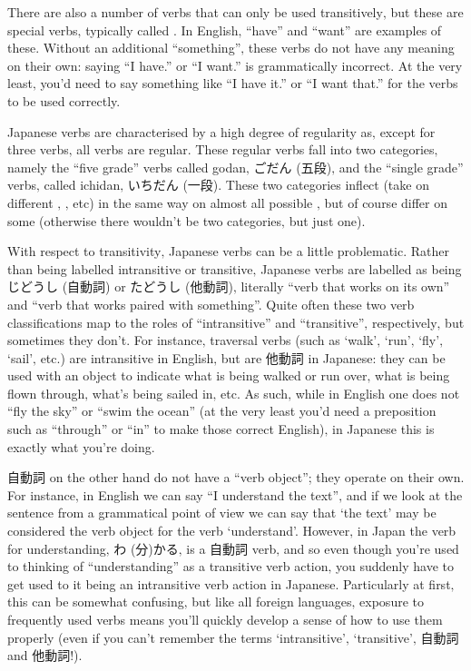 \documentclass[11pt, b5paper, twoside, openright, onecolumn]{book}
\makeatletter
\newcommand*{\rubystack}[2]{{\relscale{0.5}%
  \begin{tabular}[b]{@{}c@{}}%
    {#1}\\%
   {\textscale{2}{#2}}%
  \end{tabular}}%
}
\DeclareRobustCommand*{\ruby}[2]{%
  \mbox{%
    \setlength{\parskip}{0ex}%
    \BeginAccSupp{method=pdfstringdef,ActualText={#1}}%
      \rubystack{\phantom{#2}}{#1}%
      \llap{%
        \rubystack{#2}{\phantom{#1}}%
      }%
    \EndAccSupp{}%
  }%
}
\renewcommand*{\ruby}[2]{#2 (#1)}%
\makeatother
\begin{document}
There are also a number of verbs that can only be used transitively‚ but these are special verbs‚ typically called . In English‚ “have” and “want” are examples of these. Without an additional “something”‚ these verbs do not have any meaning on their own: saying “I have.” or “I want.” is grammatically incorrect. At the very least‚ you’d need to say something like “I have it.” or “I want that.” for the verbs to be used correctly.

Japanese verbs are characterised by a high degree of regularity as‚ except for three verbs‚ all verbs are regular. These regular verbs fall into two categories‚ namely the “five grade” verbs called godan‚ \ruby{五段}{ごだん}‚ and the “single grade” verbs‚ called ichidan‚ \ruby{一段}{いちだん}. These two categories inflect (take on different ‚ ‚ etc) in the same way on almost all possible ‚ but of course differ on some (otherwise there wouldn’t be two categories‚ but just one).

With respect to transitivity‚ Japanese verbs can be a little problematic. Rather than being labelled intransitive or transitive‚ Japanese verbs are labelled as being \ruby{自動詞}{じどうし} or \ruby{他動詞}{たどうし}‚ literally “verb that works on its own” and “verb that works paired with something”. Quite often these two verb classifications map to the roles of “intransitive” and “transitive”‚ respectively‚ but sometimes they don’t. For instance‚ traversal verbs (such as ‘walk’‚ ‘run’‚ ‘fly’‚ ‘sail’‚ etc.) are intransitive in English‚ but are 他動詞 in Japanese: they can be used with an object to indicate what is being walked or run over‚ what is being flown through‚ what’s being sailed in‚ etc. As such‚ while in English one does not “fly the sky” or “swim the ocean” (at the very least you’d need a preposition such as “through” or “in” to make those correct English)‚ in Japanese this is exactly what you’re doing.

自動詞 on the other hand do not have a “verb object”; they operate on their own. For instance‚ in English we can say “I understand the text”‚ and if we look at the sentence from a grammatical point of view we can say that ‘the text’ may be considered the verb object for the verb ‘understand’. However‚ in Japan the verb for understanding‚ \ruby{分}{わ}かる‚ is a 自動詞 verb‚ and so even though you’re used to thinking of “understanding” as a transitive verb action‚ you suddenly have to get used to it being an intransitive verb action in Japanese. Particularly at first‚ this can be somewhat confusing‚ but like all foreign languages‚ exposure to frequently used verbs means you’ll quickly develop a sense of how to use them properly (even if you can’t remember the terms ‘intransitive’‚ ‘transitive’‚ 自動詞 and 他動詞!).
\end{document}
